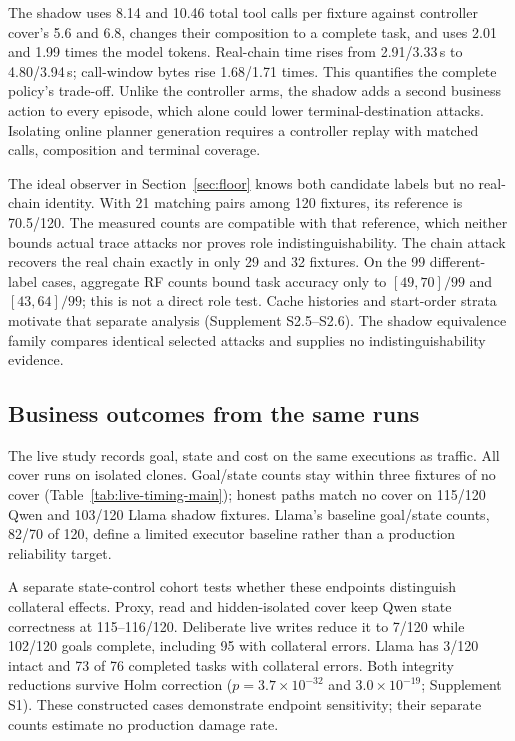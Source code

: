 The shadow uses 8.14 and 10.46 total tool calls per fixture against controller cover's 5.6 and 6.8, changes their composition to a complete task, and uses 2.01 and 1.99 times the model tokens. Real-chain time rises from 2.91/3.33\,s to 4.80/3.94\,s; call-window bytes rise 1.68/1.71 times. This quantifies the complete policy's trade-off. Unlike the controller arms, the shadow adds a second business action to every episode, which alone could lower terminal-destination attacks. Isolating online planner generation requires a controller replay with matched calls, composition and terminal coverage.

The ideal observer in Section~\ref{sec:floor} knows both candidate labels but no real-chain identity. With 21 matching pairs among 120 fixtures, its reference is 70.5/120. The measured counts are compatible with that reference, which neither bounds actual trace attacks nor proves role indistinguishability. The chain attack recovers the real chain exactly in only 29 and 32 fixtures. On the 99 different-label cases, aggregate RF counts bound task accuracy only to $[49,70]/99$ and $[43,64]/99$; this is not a direct role test. Cache histories and start-order strata motivate that separate analysis (Supplement S2.5--S2.6). The shadow equivalence family compares identical selected attacks and supplies no indistinguishability evidence.

\subsection{Business outcomes from the same runs}\label{sec:state}
The live study records goal, state and cost on the same executions as traffic. All cover runs on isolated clones. Goal/state counts stay within three fixtures of no cover (Table~\ref{tab:live-timing-main}); honest paths match no cover on 115/120 Qwen and 103/120 Llama shadow fixtures. Llama's baseline goal/state counts, 82/70 of 120, define a limited executor baseline rather than a production reliability target.

A separate state-control cohort tests whether these endpoints distinguish collateral effects. Proxy, read and hidden-isolated cover keep Qwen state correctness at 115--116/120. Deliberate live writes reduce it to 7/120 while 102/120 goals complete, including 95 with collateral errors. Llama has 3/120 intact and 73 of 76 completed tasks with collateral errors. Both integrity reductions survive Holm correction ($p=3.7\times10^{-32}$ and $3.0\times10^{-19}$; Supplement S1). These constructed cases demonstrate endpoint sensitivity; their separate counts estimate no production damage rate.

